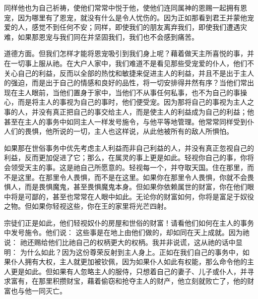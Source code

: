 \par

同样他也为自己祈祷，使他们常常中悦于他，使他们连同属神的恩赐一起拥有恩宠，因为哪里有了恩宠，就没有什么是令人忧伤的。因为正如那看到君王并蒙他宠爱的人，感觉不到任何不安；同样，即使我们的朋友离弃我们，即使我们遭遇灾难，如果那恩宠与我们同在并坚固我们，我们也不会感到痛苦。\par

道德方面。但我们怎样才能将恩宠吸引到我们身上呢？藉着做天主所喜悦的事，并在一切事上服从祂。在大户人家中，我们难道不是看见那些受宠爱的仆人，他们不关心自己的利益，反而以全部的热忱和敏捷来促进主人的利益，并且不是出于主人的强迫，而是出于自己的情感和良好的品性，将一切安排得井然有序？当他们常出现在主人眼前，当他们置身于家中，当他们不从事任何私事，也不为自己的事操心，而是将主人的事视为自己的事时，他们便受宠。因为那将自己的事视为主人之事的人，并没有真正把自己的事交给主人，而是使主人的利益成为自己的利益；他甚至在主人的事务中如同主人一样发号施令，与他平等地管理。他常常同样受到仆人们的畏惧，他所说的一切，主人也这样说，从此他被所有的敌人所惧怕。\par

如果那在世俗事务中优先考虑主人利益而非自己利益的人，并没有真正忽视自己的利益，反而更加促进了它；那么，在属灵的事上更是如此。轻视你自己的事，你将会领受天主的事。这是祂自己所愿意的。轻视每一个，并夺取天国。住在那里，而不是这里。在那里令人畏惧，而不是在这里。如果你在那里令人畏惧，你就不会畏惧人，而是畏惧魔鬼，甚至畏惧魔鬼本身。但如果你依赖属世的财富，你在他们眼中将是可鄙的，甚至也常常在人眼中如此。无论你的财富如何，你将是富足于奴役之物。但如果你轻视这些，你在王的家里将光芒四射。\par

宗徒们正是如此，他们轻视奴仆的房屋和世俗的财富！请看他们如何在主人的事务中发号施令。他们说： 这些事是在地上由他们做的，却如同在天上成就。因为祂说： 祂还赐给他们比祂自己的权柄更大的权柄。我并非说谎，这从祂的话中显明： 为什么如此？因为这份尊荣反射到主人身上。正如在我们自己的事务中，如果仆人拥有大权，主人就更加被钦佩，因为如果仆人如此有权能，那么命令他的主人更是如此。但如果有人忽略主人的服侍，只想着自己的妻子、儿子或仆人，并寻求富有，在那里积攒财宝，藉着偷窃和抢夺主人的财产，他立刻就败亡了，他的财富也与他一同灭亡。\par

